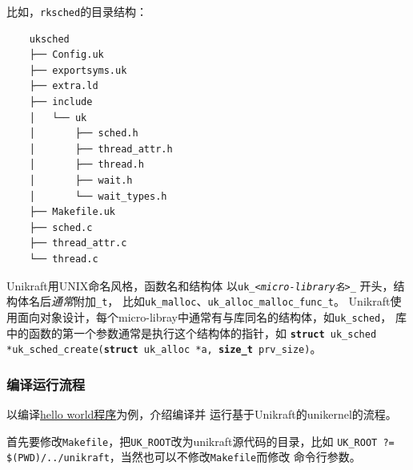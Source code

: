 \documentclass{../runikraft-report}
\begin{document}
比如，\texttt{rksched}的目录结构：
{\linespread{1}
\begin{verbatim}
    uksched
    ├── Config.uk
    ├── exportsyms.uk
    ├── extra.ld
    ├── include
    │   └── uk
    │       ├── sched.h
    │       ├── thread_attr.h
    │       ├── thread.h
    │       ├── wait.h
    │       └── wait_types.h
    ├── Makefile.uk
    ├── sched.c
    ├── thread_attr.c
    └── thread.c
\end{verbatim}}

Unikraft用UNIX命名风格，函数名和结构体
以\texttt{uk\_\hspace{0cm}\textit{<micro-library\hspace{0cm}名\hspace{0cm}>}\hspace{0cm}\_}
开头，结构体名后\textit{通常}附加\texttt{\_t}，
比如\texttt{uk\_malloc}、\texttt{uk\_alloc\_malloc\_func\_t}。
Unikraft使用面向对象设计，每个micro-libray中通常有与库同名的结构体，如\texttt{uk\_sched}，
库中的函数的第一个参数通常是执行这个结构体的指针，如
\texttt{\textbf{struct} uk\_sched *uk\_sched\_create(\textbf{struct} uk\_alloc *a, \textbf{size\_t} prv\_size)}。

\subsubsection{编译运行流程}
以编译\href{https://github.com/unikraft/app-helloworld}{hello world程序}为例，介绍编译并
运行基于Unikraft的unikernel的流程。

首先要修改\texttt{Makefile}，把\texttt{UK\_ROOT}改为unikraft源代码的目录，比如
\texttt{UK\_ROOT ?= \linebreak\$(PWD)/../unikraft}，当然也可以不修改\texttt{Makefile}而修改
命令行参数。
\end{document}
